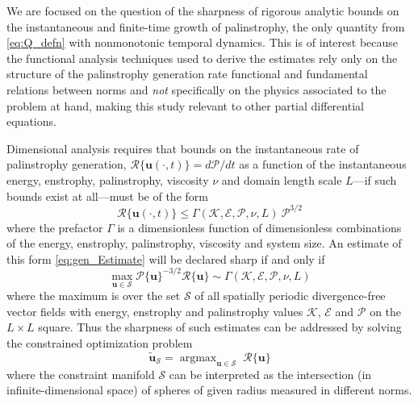 \documentclass[11pt]{article}
\def\E{{\mathcal{E}}}
\def\P{{\mathcal{P}}}
\def\R{{\mathcal{R}}}
\def\K{{\mathcal{K}}}
\newcommand{\uvec}{\mathbf{u}}
\newcommand{\tuvec}{\widetilde{\mathbf{u}}}
\begin{document}
We are focused on the question of the sharpness of rigorous analytic bounds on the instantaneous and finite-time growth of palinstrophy, the only quantity from \eqref{eq:Q_defn} with nonmonotonic temporal dynamics.
This is of interest because the functional analysis techniques used to derive the estimates rely only on the structure of the palinstrophy generation rate functional and fundamental relations between norms and {\it not} specifically on the physics associated to the problem at hand, making this study relevant to other partial differential equations.

Dimensional analysis requires that bounds on the instantaneous rate of palinstrophy generation, $\R\{\uvec(\cdot,t)\} = d\P/dt$ as a function of the instantaneous energy, enstrophy, palinstrophy, viscosity $\nu$ and domain length scale $L$---if such bounds exist at all---must be of the form
\begin{equation}\label{eq:gen_Estimate}
\R\{\uvec(\cdot,t)\} \leq \Gamma(\K,\E,\P,\nu,L) \ \P^{3/2}
\end{equation} 
where the prefactor $\Gamma$ is a dimensionless function of dimensionless combinations of the energy, enstrophy, palinstrophy, viscosity and system size.
An estimate of this form \eqref{eq:gen_Estimate} will be declared sharp if and only if
\begin{equation*}
\max_{\uvec \in \mathcal{S}} \P\{\uvec\}^{-3/2} \R\{\uvec\} \sim \Gamma(\K,\E,\P,\nu,L)
\end{equation*}
where the maximum is over the set $\mathcal{S}$ of all spatially periodic divergence-free vector fields with energy, enstrophy and palinstrophy values $\K$, $\E$ and $\P$ on the  $L \times L$ square. Thus the sharpness of such estimates can be addressed by solving the constrained optimization problem
\begin{equation}
\tuvec_{\mathcal{S}} = \mathop{\arg\max}_{\uvec \in \mathcal{S}} \; \R\{\uvec\}
\end{equation}
where the constraint manifold $\mathcal{S}$ can be interpreted as the intersection (in infinite-dimensional space) of spheres of given radius measured in different norms.
\end{document}
